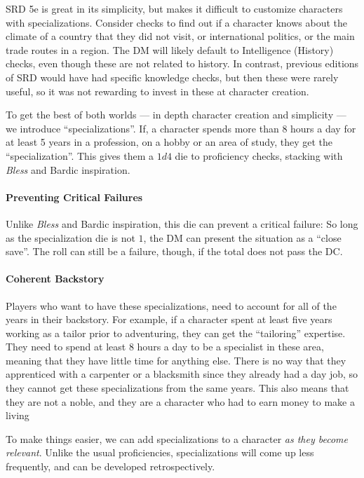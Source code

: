 \documentclass[twocolumn]{dndbook}
\begin{document}
SRD 5e is great in its simplicity, but makes it difficult to customize characters with specializations.
Consider checks to find out if a character knows about the climate of a country that they did not visit,
or international politics, or the main trade routes in a region.
The DM will likely default to Intelligence (History) checks, even though these are not related to history.
In contrast, previous editions of SRD would have had specific knowledge checks, but then these were rarely useful,
so it was not rewarding to invest in these at character creation.\par

To get the best of both worlds --- in depth character creation and simplicity --- we introduce ``specializations''.
If, a character spends more than 8 hours a day for at least 5 years in a profession, on a hobby or an area of study,
they get the ``specialization''.
This gives them a $1d4$ die to proficiency checks, stacking with \emph{Bless} and Bardic inspiration.\par

\paragraph*{Preventing Critical Failures}
Unlike \emph{Bless} and Bardic inspiration, this die can prevent a critical failure:
So long as the specialization die is not $1$, the DM can present the situation as a ``close save''.
The roll can still be a failure, though, if the total does not pass the DC.\par


\paragraph*{Coherent Backstory} Players who want to have these specializations,
need to account for all of the years in their backstory.
For example, if a character spent at least five years working as a tailor prior to adventuring,
they can get the ``tailoring'' expertise.
They need to spend at least 8 hours a day to be a specialist in these area, meaning that they have little time for anything else.
There is no way that they apprenticed with a carpenter or a blacksmith since they already
had a day job, so they cannot get these specializations from the same years.
This also means that they are not a noble, and they are a character who had to earn money to make a living\par

To make things easier, we can add specializations to a character \emph{as they become relevant}.
Unlike the usual proficiencies, specializations will come up less frequently, and can be developed
retrospectively.\par
\end{document}
